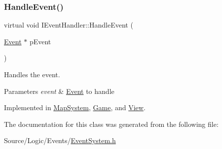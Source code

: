 \subsubsection{\texorpdfstring{Handle\+Event()}{HandleEvent()}}
{\footnotesize\ttfamily virtual void I\+Event\+Handler\+::\+Handle\+Event (\begin{DoxyParamCaption}\item[{\mbox{\hyperlink{struct_event}{Event}} $\ast$}]{p\+Event }\end{DoxyParamCaption})\hspace{0.3cm}{\ttfamily [pure virtual]}}



Handles the event. 


\begin{DoxyParams}{Parameters}
{\em event} & \mbox{\hyperlink{struct_event}{Event}} to handle \\
\hline
\end{DoxyParams}


Implemented in \mbox{\hyperlink{class_map_system_aa9043b7359220c63274a6d0b520bfe10}{Map\+System}}, \mbox{\hyperlink{class_game_a379673c1cde729d801e6f14f7b394810}{Game}}, and \mbox{\hyperlink{class_view_abaeae948fb2fbc2585756afc6962b66e}{View}}.



The documentation for this class was generated from the following file\+:\begin{DoxyCompactItemize}
\item 
Source/\+Logic/\+Events/\mbox{\hyperlink{_event_system_8h}{Event\+System.\+h}}\end{DoxyCompactItemize}
